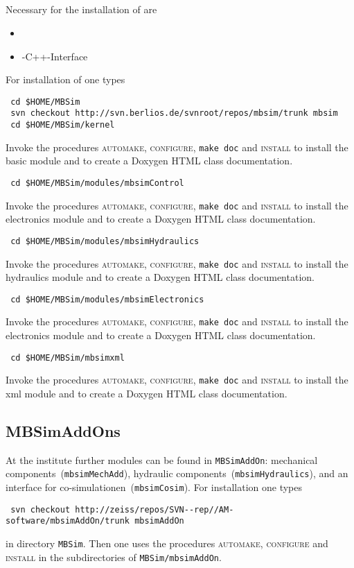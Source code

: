 \subsection{\MBSim}
Necessary for the installation of \MBSim{} are
\begin{itemize}
\item \FMatVec{}
\item \OpenMBV{}-C++-Interface
\end{itemize}
For installation of \MBSim{} one types
\begin{verbatim}
 cd $HOME/MBSim
 svn checkout http://svn.berlios.de/svnroot/repos/mbsim/trunk mbsim
 cd $HOME/MBSim/kernel
\end{verbatim}
Invoke the procedures \textsc{automake, configure}, \texttt{make doc} and \textsc{install} to install the basic module and to create a Doxygen HTML class documentation. 
\begin{verbatim}
 cd $HOME/MBSim/modules/mbsimControl
\end{verbatim}
Invoke the procedures \textsc{automake, configure}, \texttt{make doc} and \textsc{install} to install the electronics module and to create a Doxygen HTML class documentation. 
\begin{verbatim}
 cd $HOME/MBSim/modules/mbsimHydraulics
\end{verbatim}
Invoke the procedures \textsc{automake, configure}, \texttt{make doc} and \textsc{install} to install the hydraulics module and to create a Doxygen HTML class documentation. 
\begin{verbatim}
 cd $HOME/MBSim/modules/mbsimElectronics
\end{verbatim}
Invoke the procedures \textsc{automake, configure}, \texttt{make doc} and \textsc{install} to install the electronics module and to create a Doxygen HTML class documentation. 
\begin{verbatim}
 cd $HOME/MBSim/mbsimxml
\end{verbatim}
Invoke the procedures \textsc{automake, configure}, \texttt{make doc} and \textsc{install} to install the xml module and to create a Doxygen HTML class documentation. 

\subsection{MBSimAddOns}
At the institute further modules can be found in \texttt{MBSimAddOn}: mechanical components~(\texttt{mbsimMechAdd}), hydraulic components~(\texttt{mbsimHydraulics}), and an interface for co-simulationen~(\texttt{mbsimCosim}). For installation one types
\begin{verbatim}
 svn checkout http://zeiss/repos/SVN--rep//AM-software/mbsimAddOn/trunk mbsimAddOn
\end{verbatim}
in directory \texttt{MBSim}. Then one uses the procedures \textsc{automake, configure} and \textsc{install} in the subdirectories of \texttt{MBSim/mbsimAddOn}.

